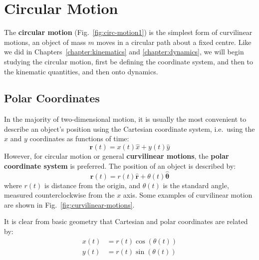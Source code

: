 \chapter{Circular Motion}
\label{chapter:circ-motion}

The \textbf{circular motion} (Fig.~\ref{fig:circ-motion1}) is the simplest
form of curvilinear motions, an object of mass $m$ moves in a circular path
about a fixed centre.
Like we did in Chapters~\ref{chapter:kinematics} and \ref{chapter:dynamics},
we will begin studying the circular motion, first be defining the coordinate
system, and then to the kinematic quantities, and then onto dynamics.

\section{Polar Coordinates}
In the majority of two-dimensional motion, 
it is usually the most convenient to describe an object's position using the
Cartesian coordinate system, i.e.\ using the $x$ and $y$ coordinates as
functions of time:
\begin{equation}
  \mathbf r(t)=x(t)\hat x + y(t)\hat y
\end{equation}
However, for circular motion or general \textbf{curvilinear motions}, the
\textbf{polar coordinate system} is preferred. The position of an object is
described by:
\begin{equation}
  \mathbf r(t)=r(t)\hat{\bm r} + \theta(t)\hat{\bm\theta}
\end{equation}
where $r(t)$ is distance from the origin, and $\theta(t)$ is the standard
angle, measured counterclockwise from the $x$ axis. Some examples of
curvilinear motion are shown in Fig.~\ref{fig:curvilinear-motions}.

It is clear from basic geometry that Cartesian and polar coordinates are
related by:
\begin{align*}
  x(t)&=r(t)\cos\left(\theta(t)\right)\\
  y(t)&=r(t)\sin\left(\theta(t)\right)
\end{align*}

